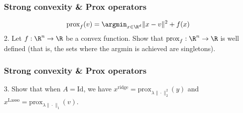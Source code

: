 \documentclass{beamer}
\begin{document}
\begin{frame}[t]
\frametitle{Strong convexity \& Prox operators}
\vspace{-25pt}
\begin{align*}
\text{prox}_f(v) = \argmin_{x \in \R^d} \|x-v\|^2 + f(x)
\end{align*}
2. Let $f : \R^n \rightarrow \R$ be a convex function. Show that $\text{prox}_f : \R^n \rightarrow \R$ is well defined (that is, the sets where the argmin is achieved are singletons).
\end{frame}

\begin{frame}[t]
\frametitle{Strong convexity \& Prox operators}
\vspace{-5pt}
3. Show that when $A=\text{Id}$, we have $x^{\text{ridge}} = \text{prox}_{\lambda \|\cdot\|_2^2}(y)$ and $x^{\text{Lasso}} = \text{prox}_{\lambda \|\cdot\|_1}(v)$.
\end{frame}
\end{document}
